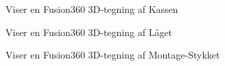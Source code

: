 \documentclass[11pt]{article}
\begin{document}
\begin{figure}[htbp]
    \centering
    \caption{Viser en Fusion360 3D-tegning af Kassen}
    \end{figure}

\begin{figure}[htbp]
    \centering
    \caption{Viser en Fusion360 3D-tegning af Låget}
    \end{figure}

\begin{figure}[htbp]
    \centering
    \caption{Viser en Fusion360 3D-tegning af Montage-Stykket}
    \end{figure}
\end{document}
